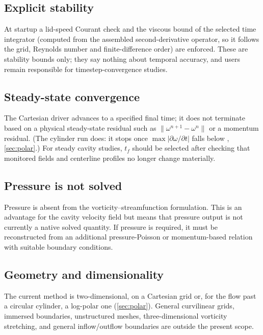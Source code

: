 \documentclass[11pt,a4paper]{article}
\newcommand{\code}[1]{\texttt{\detokenize{#1}}}
\begin{document}
\subsection{Explicit stability}

At startup a lid-speed Courant check and the viscous bound of the selected time integrator (computed from the assembled second-derivative operator, so it follows the grid, Reynolds number and finite-difference order) are enforced.  These are stability bounds only; they say nothing about temporal accuracy, and users remain responsible for timestep-convergence studies.

\subsection{Steady-state convergence}

The Cartesian driver advances to a specified final time; it does not terminate based on a physical steady-state residual such as $\|\omega^{n+1}-\omega^n\|$ or a momentum residual.  (The cylinder run does: it stops once $\max|\partial\omega/\partial t|$ falls below \code{--steady-tol}, \cref{sec:polar}.)  For steady cavity studies, $t_f$ should be selected after checking that monitored fields and centerline profiles no longer change materially.

\subsection{Pressure is not solved}

Pressure is absent from the vorticity--streamfunction formulation.  This is an advantage for the cavity velocity field but means that pressure output is not currently a native solved quantity.  If pressure is required, it must be reconstructed from an additional pressure-Poisson or momentum-based relation with suitable boundary conditions.

\subsection{Geometry and dimensionality}

The current method is two-dimensional, on a Cartesian grid or, for the flow past a circular cylinder, a log-polar one (\cref{sec:polar}).  General curvilinear grids, immersed boundaries, unstructured meshes, three-dimensional vorticity stretching, and general inflow/outflow boundaries are outside the present scope.

\end{document}
